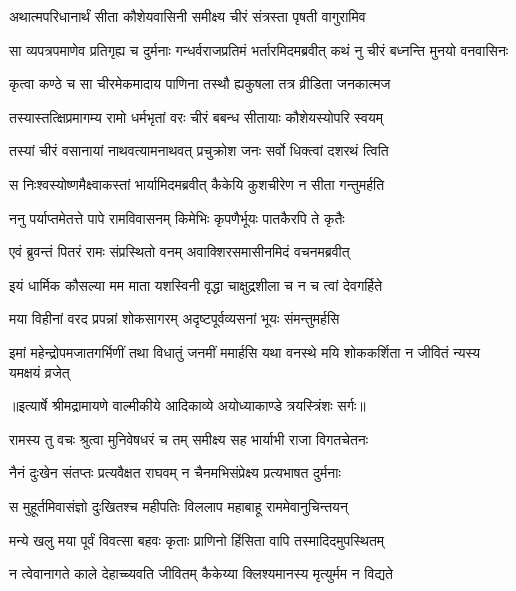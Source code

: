 \twolineshloka
{अथात्मपरिधानार्थं सीता कौशेयवासिनी}
{समीक्ष्य चीरं संत्रस्ता पृषती वागुरामिव} %

\threelineshloka
{सा व्यपत्रपमाणेव प्रतिगृह्य च दुर्मनाः}
{गन्धर्वराजप्रतिमं भर्तारमिदमब्रवीत्}
{कथं नु चीरं बध्नन्ति मुनयो वनवासिनः} %

\twolineshloka
{कृत्वा कण्ठे च सा चीरमेकमादाय पाणिना}
{तस्थौ ह्यकुषला तत्र व्रीडिता जनकात्मज} %

\twolineshloka
{तस्यास्तत्क्षिप्रमागम्य रामो धर्मभृतां वरः}
{चीरं बबन्ध सीतायाः कौशेयस्योपरि स्वयम्} %

\twolineshloka
{तस्यां चीरं वसानायां नाथवत्यामनाथवत्}
{प्रचुक्रोश जनः सर्वो धिक्त्वां दशरथं त्विति} %

\twolineshloka
{स निःश्वस्योष्णमैक्ष्वाकस्तां भार्यामिदमब्रवीत्}
{कैकेयि कुशचीरेण न सीता गन्तुमर्हति} %

\twolineshloka
{ननु पर्याप्तमेतत्ते पापे रामविवासनम्}
{किमेभिः कृपणैर्भूयः पातकैरपि ते कृतैः} %

\twolineshloka
{एवं ब्रुवन्तं पितरं रामः संप्रस्थितो वनम्}
{अवाक्शिरसमासीनमिदं वचनमब्रवीत्} %

\twolineshloka
{इयं धार्मिक कौसल्या मम माता यशस्विनी}
{वृद्धा चाक्षुद्रशीला च न च त्वां देवगर्हिते} %

\twolineshloka
{मया विहीनां वरद प्रपन्नां शोकसागरम्}
{अदृष्टपूर्वव्यसनां भूयः संमन्तुमर्हसि} %

\fourlineindentedshloka
{इमां महेन्द्रोपमजातगर्भिणीं}
{ तथा विधातुं जनमीं ममार्हसि}
{यथा वनस्थे मयि शोककर्शिता}
{ न जीवितं न्यस्य यमक्षयं व्रजेत्} %


{॥इत्यार्षे श्रीमद्रामायणे वाल्मीकीये आदिकाव्ये अयोध्याकाण्डे त्रयस्त्रिंशः सर्गः॥}


\twolineshloka
{रामस्य तु वचः श्रुत्वा मुनिवेषधरं च तम्}
{समीक्ष्य सह भार्याभी राजा विगतचेतनः} %

\twolineshloka
{नैनं दुःखेन संतप्तः प्रत्यवैक्षत राघवम्}
{न चैनमभिसंप्रेक्ष्य प्रत्यभाषत दुर्मनाः} %

\twolineshloka
{स मुहूर्तमिवासंज्ञो दुःखितश्च महीपतिः}
{विललाप महाबाहू राममेवानुचिन्तयन्} %

\twolineshloka
{मन्ये खलु मया पूर्वं विवत्सा बहवः कृताः}
{प्राणिनो हिंसिता वापि तस्मादिदमुपस्थितम्} %

\twolineshloka
{न त्वेवानागते काले देहाच्च्यवति जीवितम्}
{कैकेय्या क्लिश्यमानस्य मृत्युर्मम न विद्यते} %

